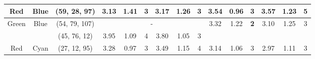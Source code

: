 \begin{table}[htbp]
{\begin{tabular}{@{}ccclcccccccccccc@{}}
    Red                     & \multicolumn{1}{c|}{Blue}                      & \multicolumn{2}{c|}{\cellcolor[HTML]{FF00FF}(59, 28, 97)}  & \multicolumn{1}{c|}{3.13} & \multicolumn{1}{c|}{1.41}  & \multicolumn{1}{c|}{3}                                  & \multicolumn{1}{c|}{3.17} & \multicolumn{1}{c|}{1.26}  & \multicolumn{1}{c||}{3}                                  & \multicolumn{1}{c|}{3.54}                   & \multicolumn{1}{c|}{0.96}                   & \multicolumn{1}{c|}{3}                                  & \multicolumn{1}{c|}{3.57}                   & \multicolumn{1}{c|}{1.23}                   & \multicolumn{1}{c|}{\cellcolor[HTML]{32CB00}\textbf{5}}                   \\ \midrule
    Green                   & \multicolumn{1}{c|}{Blue}                      & \multicolumn{2}{c|}{\cellcolor[HTML]{00FFFF}(54, 79, 107)} & \multicolumn{6}{c||}{-}                                                                                                                                                                                                              & \multicolumn{1}{c|}{3.32}                   & \multicolumn{1}{c|}{1.22}                   & \multicolumn{1}{c|}{\cellcolor[HTML]{FD6864}\textbf{2}} & \multicolumn{1}{c|}{3.10}                   & \multicolumn{1}{c|}{1.25}                   & \multicolumn{1}{c|}{3}                                                    \\ \midrule
                            & \multicolumn{1}{c|}{}                          & \multicolumn{2}{c|}{\cellcolor[HTML]{80FF00}(45, 76, 12)}  & \multicolumn{1}{c|}{3.95} & \multicolumn{1}{c|}{1.09}  & \multicolumn{1}{c|}{4}                                  & \multicolumn{1}{c|}{3.80} & \multicolumn{1}{c|}{1.05}  & \multicolumn{1}{c||}{3}                                  & \multicolumn{1}{c|}{}                       & \multicolumn{1}{c|}{}                       & \multicolumn{1}{c|}{}                                   & \multicolumn{1}{c|}{}                       & \multicolumn{1}{c|}{}                       & \multicolumn{1}{c|}{}                                                     \\ \cmidrule(lr){3-10}
    \multirow{-2}{*}{Red}   & \multicolumn{1}{c|}{\multirow{-2}{*}{Cyan}}    & \multicolumn{2}{c|}{\cellcolor[HTML]{7F00FF}(27, 12, 95)}  & \multicolumn{1}{c|}{3.28} & \multicolumn{1}{c|}{0.97}  & \multicolumn{1}{c|}{3}                                  & \multicolumn{1}{c|}{3.49} & \multicolumn{1}{c|}{1.15}  & \multicolumn{1}{c||}{4}                                  & \multicolumn{1}{c|}{\multirow{-2}{*}{3.14}} & \multicolumn{1}{c|}{\multirow{-2}{*}{1.06}} & \multicolumn{1}{c|}{\multirow{-2}{*}{3}}                & \multicolumn{1}{c|}{\multirow{-2}{*}{2.97}} & \multicolumn{1}{c|}{\multirow{-2}{*}{1.11}} & \multicolumn{1}{c|}{\multirow{-2}{*}{3}}                                  \\ \midrule

\end{tabular}}
\end{table}
